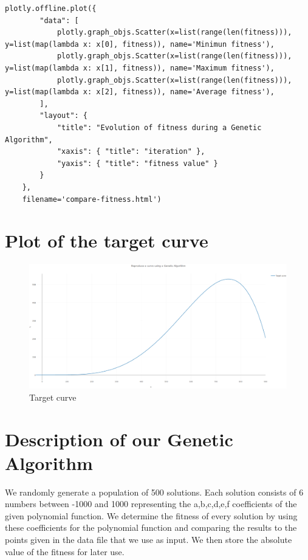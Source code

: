 \documentclass[12pt]{article}
\begin{document}
\begin{lstlisting}[frame=single,caption=Compute of the fitness value]
plotly.offline.plot({
        "data": [
            plotly.graph_objs.Scatter(x=list(range(len(fitness))), y=list(map(lambda x: x[0], fitness)), name='Minimun fitness'),
            plotly.graph_objs.Scatter(x=list(range(len(fitness))), y=list(map(lambda x: x[1], fitness)), name='Maximum fitness'),
            plotly.graph_objs.Scatter(x=list(range(len(fitness))), y=list(map(lambda x: x[2], fitness)), name='Average fitness'),
        ],
        "layout": {
            "title": "Evolution of fitness during a Genetic Algorithm",
            "xaxis": { "title": "iteration" },
            "yaxis": { "title": "fitness value" }
        }
    },
    filename='compare-fitness.html')
\end{lstlisting}

\section{Plot of the target curve}

\begin{figure}[H]
	\centering
	\includegraphics[width=1.0\columnwidth]{./plot_target.png}
	\caption{Target curve}
\end{figure}

\section{Description of our Genetic Algorithm}

We randomly generate a population of 500 solutions. Each solution consists of 6 numbers between -1000 and 1000 representing the a,b,c,d,e,f coefficients of the given polynomial function. We determine the fitness of every solution by using these coefficients for the polynomial function and comparing the results to the points given in the data file that we use as input. We then store the absolute value of the fitness for later use.
\end{document}
